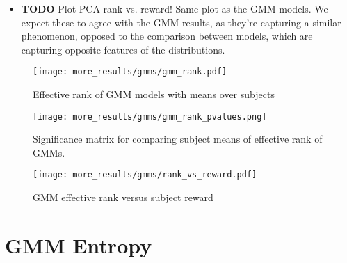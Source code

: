 \documentclass[../main.tex]{subfiles}
\begin{document}
\begin{itemize}
  \item \textbf{TODO} Plot PCA rank vs. reward! Same plot as the GMM models. We expect these to agree with the GMM results, as they're capturing a similar phenomenon, opposed to the comparison between models, which are capturing opposite features of the distributions.
\end{itemize}

\begin{figure}[H]%
  \centering
    \texttt{[image: more\_results/gmms/gmm\_rank.pdf]}
    \caption[GMM effective rank over subjects]{Effective rank of GMM models with means over subjects}\label{fig:gmm_rank}
\end{figure}

\begin{figure}[H]%
  \centering
    \texttt{[image: more\_results/gmms/gmm\_rank\_pvalues.png]}
    \caption[GMM effective rank significance matrix]{Significance matrix for comparing subject means of effective rank of GMMs.}\label{fig:gmm_rank_pvalues}
\end{figure}

\begin{figure}[H]%
  \centering
    \texttt{[image: more\_results/gmms/rank\_vs\_reward.pdf]}
    \caption[GMM effective rank versus subject reward]{GMM effective rank versus subject reward}\label{fig:rank_vs_reward}
\end{figure}


\section{GMM Entropy}
\end{document}
